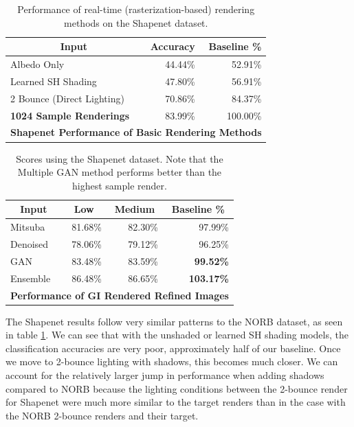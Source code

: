 \documentclass[10pt,twocolumn,letterpaper]{article}
\begin{document}
\begin{table}[]
\centering
\begin{tabular}{|l|r|r|}
\hline
\multicolumn{1}{|c|}{\textbf{Input}}
& \multicolumn{1}{r|}{\textbf{Accuracy}}
& \multicolumn{1}{r|}{\textbf{Baseline \%}} \\ \hline
Albedo Only 				&44.44\%	& 52.91\%	\\
Learned SH Shading			&47.80\%	& 56.91\%	\\
2 Bounce (Direct Lighting)	&70.86\%	& 84.37\%   \\
\textbf{1024 Sample Renderings}		& 83.99\%	& 100.00\%	\\ \hline
\multicolumn{3}{|c|}{\textbf{Shapenet Performance of Basic Rendering Methods}}	\\ \hline
\end{tabular}
\caption{Performance of real-time (rasterization-based) rendering methods on the Shapenet dataset.}
\label{table:tblnonGI_sn}
\end{table}

\begin{table}[]
\centering
\begin{tabular}{|l|r|r|r|}
\hline
\multicolumn{1}{|c|}{\textbf{Input}}
& \multicolumn{1}{c|}{\textbf{Low}}
& \multicolumn{1}{c|}{\textbf{Medium}}
& \multicolumn{1}{c|}{\textbf{Baseline \%}} \\ \hline
Mitsuba		& 81.68\%	& 82.30\%	& 97.99\% \\
Denoised	& 78.06\%	& 79.12\%	& 96.25\%	\\
GAN	& 83.48\%	& 83.59\%	& \textbf{99.52\%}	\\
Ensemble& 86.48\%	& 86.65\% 	& \textbf{103.17\%}		\\ \hline
\multicolumn{4}{|c|}{\textbf{Performance of GI Rendered Refined Images}}	\\ \hline
\end{tabular}
\caption{Scores using the Shapenet dataset. Note that the Multiple GAN method performs better than the highest sample render.
}
\label{table:tblallrefined_sn}
\end{table}

The Shapenet results follow very similar patterns to the NORB dataset, as seen in table \ref{table:tblnonGI_sn}. We can see that with the unshaded or learned SH shading models, the classification accuracies are very poor, approximately half of our baseline. Once we move to 2-bounce lighting with shadows, this becomes much closer. We can account for the relatively larger jump in performance when adding shadows compared to NORB because the lighting conditions between the 2-bounce render for Shapenet were much more similar to the target renders than in the case with the NORB 2-bounce renders and their target. %
\end{document}
